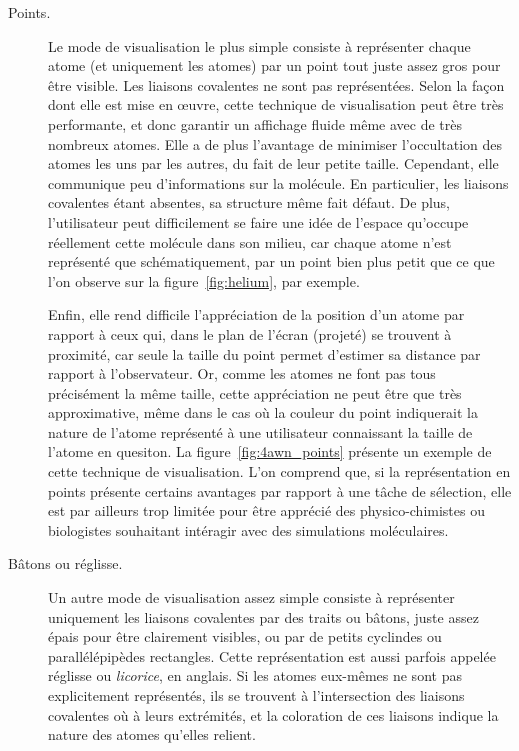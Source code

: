 	\begin{description}
		\item[Points.] Le mode de visualisation le plus simple consiste à représenter chaque atome (et uniquement les atomes) par un point tout juste assez gros pour être visible. Les liaisons covalentes ne sont pas représentées. Selon la façon dont elle est mise en œuvre, cette technique de visualisation peut être très performante, et donc garantir un affichage fluide même avec de très nombreux atomes. Elle a de plus l'avantage de minimiser l'occultation des atomes les uns par les autres, du fait de leur petite taille. Cependant, elle communique peu d'informations sur la molécule. En particulier, les liaisons covalentes étant absentes, sa structure même fait défaut. De plus, l'utilisateur peut difficilement se faire une idée de l'espace qu'occupe réellement cette molécule dans son milieu, car chaque atome n'est représenté que schématiquement, par un point bien plus petit que ce que l'on observe sur la figure~\ref{fig:helium}, par exemple.
		
	    Enfin, elle rend difficile l'appréciation de la position d'un atome par rapport à ceux qui, dans le plan de l'écran (projeté) se trouvent à proximité, car seule la taille du point permet d'estimer sa distance par rapport à l'observateur. Or, comme les atomes ne font pas tous précisément la même taille, cette appréciation ne peut être que très approximative, même dans le cas où la couleur du point indiquerait la nature de l'atome représenté à une utilisateur connaissant la taille de l'atome en quesiton. La figure~\ref{fig:4awn_points} présente un exemple de cette technique de visualisation. L'on comprend que, si la représentation en points présente certains avantages par rapport à une tâche de sélection, elle est par ailleurs trop limitée pour être apprécié des physico-chimistes ou biologistes souhaitant intéragir avec des simulations moléculaires.
	    
		\item[Bâtons ou réglisse.] Un autre mode de visualisation assez simple consiste à représenter uniquement les liaisons covalentes par des traits ou bâtons, juste assez épais pour être clairement visibles, ou par de petits cyclindes ou parallélépipèdes rectangles. Cette représentation est aussi parfois appelée \og réglisse \fg{} ou \emph{licorice}, en anglais. Si les atomes eux-mêmes ne sont pas explicitement représentés, ils se trouvent à l'intersection des liaisons covalentes où à leurs extrémités, et la coloration de ces liaisons indique la nature des atomes qu'elles relient.
		

\end{description}
